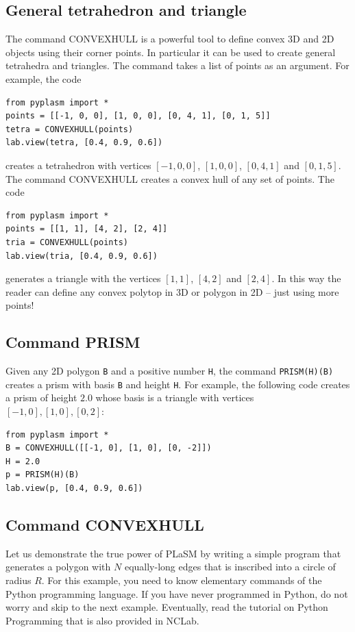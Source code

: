 \documentclass[article,A4,12pt]{llncs}
\begin{document}
\subsection{General tetrahedron and triangle}

The command CONVEXHULL is a powerful tool to define convex 3D and 2D objects using 
their corner points. In particular it can be used to create general tetrahedra and 
triangles. The command takes a list of points as an argument. For example, the code

\begin{verbatim}
from pyplasm import *
points = [[-1, 0, 0], [1, 0, 0], [0, 4, 1], [0, 1, 5]]
tetra = CONVEXHULL(points)
lab.view(tetra, [0.4, 0.9, 0.6])
\end{verbatim}
creates a tetrahedron with vertices $[-1, 0, 0]$, $[1, 0, 0]$, $[0, 4, 1]$ and $[0, 1, 5]$.
The command CONVEXHULL creates a convex hull of any set of points. The code

\begin{verbatim}
from pyplasm import *
points = [[1, 1], [4, 2], [2, 4]]
tria = CONVEXHULL(points)
lab.view(tria, [0.4, 0.9, 0.6])
\end{verbatim}
generates a triangle with the vertices $[1, 1]$, $[4, 2]$ and $[2, 4]$. In this way 
the reader can define any convex polytop in 3D or polygon in 2D -- just using more 
points!

\subsection{Command PRISM}

Given any 2D polygon {\tt B} and a positive number {\tt H}, the command {\tt PRISM(H)(B)} 
creates a prism with basis {\tt B} and height {\tt H}. For example, the 
following code creates a prism of height $2.0$ whose basis is a triangle 
with vertices $[-1, 0], [1, 0], [0, 2]$:

\begin{verbatim}
from pyplasm import *
B = CONVEXHULL([[-1, 0], [1, 0], [0, -2]])
H = 2.0
p = PRISM(H)(B)
lab.view(p, [0.4, 0.9, 0.6])
\end{verbatim}

\subsection{Command CONVEXHULL}\label{par:chull}

Let us demonstrate the true power of PLaSM by writing a simple program that generates 
a polygon with $N$ equally-long edges that is inscribed into a circle of radius $R$.
For this example, you need to know elementary commands of the Python programming 
language. If you have never programmed in Python, do not worry and skip to the next 
example. Eventually, read the tutorial on Python Programming that is also provided
in NCLab.
\end{document}
